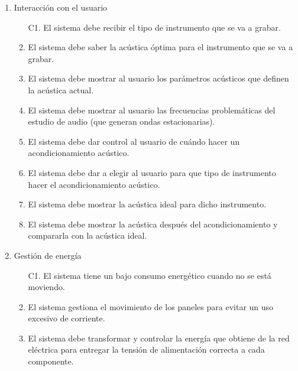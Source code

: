 \begin{enumerate}
    \item Interacción con el usuario
    \begin{enumerate}
        \item[{C}1.] El sistema debe recibir el tipo de instrumento que se va a grabar.
        \item El sistema debe saber la acústica óptima para el instrumento que se va a grabar.
        \item El sistema debe mostrar al usuario los parámetros acústicos que definen la acústica actual.
        \item El sistema debe mostrar al usuario las frecuencias problemáticas del estudio de audio (que generan ondas estacionarias).
        \item El sistema debe dar control al usuario de cuándo hacer un acondicionamiento acústico.
        \item El sistema debe dar a elegir al usuario para que tipo de instrumento hacer el acondicionamiento acústico.
        \item El sistema debe mostrar la acústica ideal para dicho instrumento.
        \item El sistema debe mostrar la acústica después del acondicionamiento y compararla con la acústica ideal. 
    \end{enumerate}

    \item Gestión de energía
    \begin{enumerate}
        \item[{C}1.] El sistema tiene un bajo consumo energético cuando no se está moviendo.
        \item El sistema gestiona el movimiento de los paneles para evitar un uso excesivo de corriente.
        \item El sistema debe transformar y controlar la energía que obtiene de la red eléctrica para entregar la tensión de alimentación correcta a cada componente.
    \end{enumerate}
\end{enumerate}


